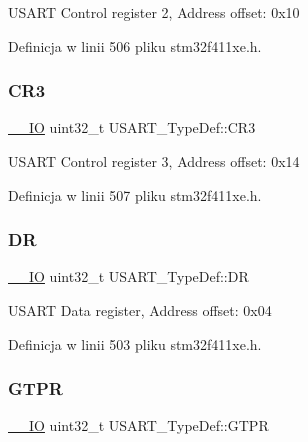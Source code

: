 U\+S\+A\+RT Control register 2, Address offset\+: 0x10 

Definicja w linii 506 pliku stm32f411xe.\+h.

\mbox{\label{struct_u_s_a_r_t___type_def_af2991da9a4e1539530cd6b7b327199cc}} 
\subsubsection{\texorpdfstring{C\+R3}{CR3}}
{\footnotesize\ttfamily \hyperlink{core__sc300_8h_aec43007d9998a0a0e01faede4133d6be}{\+\_\+\+\_\+\+IO} uint32\+\_\+t U\+S\+A\+R\+T\+\_\+\+Type\+Def\+::\+C\+R3}

U\+S\+A\+RT Control register 3, Address offset\+: 0x14 

Definicja w linii 507 pliku stm32f411xe.\+h.

\mbox{\label{struct_u_s_a_r_t___type_def_a1db25b74d47af33dc4f4fe2177fc5da0}} 
\subsubsection{\texorpdfstring{DR}{DR}}
{\footnotesize\ttfamily \hyperlink{core__sc300_8h_aec43007d9998a0a0e01faede4133d6be}{\+\_\+\+\_\+\+IO} uint32\+\_\+t U\+S\+A\+R\+T\+\_\+\+Type\+Def\+::\+DR}

U\+S\+A\+RT Data register, Address offset\+: 0x04 

Definicja w linii 503 pliku stm32f411xe.\+h.

\mbox{\label{struct_u_s_a_r_t___type_def_ae23acff49b4ff96fd29093e80fc7d72e}} 
\subsubsection{\texorpdfstring{G\+T\+PR}{GTPR}}
{\footnotesize\ttfamily \hyperlink{core__sc300_8h_aec43007d9998a0a0e01faede4133d6be}{\+\_\+\+\_\+\+IO} uint32\+\_\+t U\+S\+A\+R\+T\+\_\+\+Type\+Def\+::\+G\+T\+PR}

